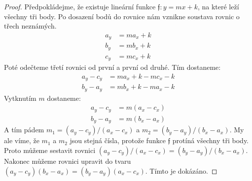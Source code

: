 \begin{proof}
    Předpokládejme, že existuje lineární funkce $\mathfrak{f}: y = mx+k$, na které leží všechny tři body. Po dosazení bodů do rovnice nám vznikne soustava rovnic o třech neznámých. 
    \begin{align*}
        a_y &= ma_x+k \\
        b_y &= mb_x+k \\
        c_y &= mc_x+k 
    \end{align*}
    Poté odečteme třetí rovnici od první a první od druhé. Tím dostaneme:
    \begin{align*}
        a_y-c_y &= ma_x+k - mc_x -k \\
        b_y-a_y &= mb_x+k -ma_x -k 
    \end{align*}
    Vytknutím $m$ dostaneme:
    \begin{align*}
        a_y-c_y &= m(a_x-c_x) \\
        b_y-a_y &= m(b_x-a_x) 
    \end{align*}
    A tím pádem $m_1 = (a_y-c_y)/(a_x-c_x)$ a $ m_2=(b_y-a_y)/(b_x-a_x)$. My ale víme, že $m_1$ a $m_2$ jsou stejná čísla, protože funkce $\mathfrak{f}$ protíná všechny tři body. Proto můžeme sestavit rovnici $(a_y-c_y)/(a_x-c_x) = (b_y-a_y)/(b_x-a_x)$. Nakonec můžeme rovnici upravit do tvaru $(a_y-c_y)(b_x-a_x) = (b_y-a_y)(a_x-c_x)$. Tímto je  dokázáno.
\end{proof}
